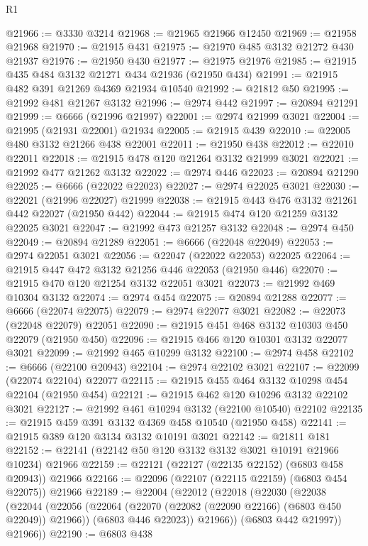 \begin{lexlean}{R1}
\begin{coremodule}
@21966 := @3330 @3214
@21968 := @21965 @21966 @12450
@21969 := @21958 @21968
@21970 := @21915 @431
@21975 := @21970 @485 @3132 @21272 @430 @21937
@21976 := @21950 @430
@21977 := @21975 @21976
@21985 := @21915 @435 @484 @3132 @21271 @434 @21936 (@21950 @434)
@21991 := @21915 @482 @391 @21269 @4369 @21934 @10540
@21992 := @21812 @50
@21995 := @21992 @481 @21267 @3132
@21996 := @2974 @442
@21997 := @20894 @21291
@21999 := @6666 (@21996 @21997)
@22001 := @2974 @21999 @3021
@22004 := @21995 (@21931 @22001) @21934
@22005 := @21915 @439
@22010 := @22005 @480 @3132 @21266 @438 @22001
@22011 := @21950 @438
@22012 := @22010 @22011
@22018 := @21915 @478 @120 @21264 @3132 @21999 @3021
@22021 := @21992 @477 @21262 @3132
@22022 := @2974 @446
@22023 := @20894 @21290
@22025 := @6666 (@22022 @22023)
@22027 := @2974 @22025 @3021
@22030 := @22021 (@21996 @22027) @21999
@22038 := @21915 @443 @476 @3132 @21261 @442 @22027 (@21950 @442)
@22044 := @21915 @474 @120 @21259 @3132 @22025 @3021
@22047 := @21992 @473 @21257 @3132
@22048 := @2974 @450
@22049 := @20894 @21289
@22051 := @6666 (@22048 @22049)
@22053 := @2974 @22051 @3021
@22056 := @22047 (@22022 @22053) @22025
@22064 := @21915 @447 @472 @3132 @21256 @446 @22053 (@21950 @446)
@22070 := @21915 @470 @120 @21254 @3132 @22051 @3021
@22073 := @21992 @469 @10304 @3132
@22074 := @2974 @454
@22075 := @20894 @21288
@22077 := @6666 (@22074 @22075)
@22079 := @2974 @22077 @3021
@22082 := @22073 (@22048 @22079) @22051
@22090 := @21915 @451 @468 @3132 @10303 @450 @22079 (@21950 @450)
@22096 := @21915 @466 @120 @10301 @3132 @22077 @3021
@22099 := @21992 @465 @10299 @3132
@22100 := @2974 @458
@22102 := @6666 (@22100 @20943)
@22104 := @2974 @22102 @3021
@22107 := @22099 (@22074 @22104) @22077
@22115 := @21915 @455 @464 @3132 @10298 @454 @22104 (@21950 @454)
@22121 := @21915 @462 @120 @10296 @3132 @22102 @3021
@22127 := @21992 @461 @10294 @3132 (@22100 @10540) @22102
@22135 := @21915 @459 @391 @3132 @4369 @458 @10540 (@21950 @458)
@22141 := @21915 @389 @120 @3134 @3132 @10191 @3021
@22142 := @21811 @181
@22152 := @22141 (@22142 @50 @120 @3132 @3132 @3021 @10191 @21966 @10234) @21966
@22159 := @22121 (@22127 (@22135 @22152) (@6803 @458 @20943)) @21966
@22166 := @22096 (@22107 (@22115 @22159) (@6803 @454 @22075)) @21966
@22189 := @22004
    (@22012
      (@22018
        (@22030
          (@22038
            (@22044
              (@22056
                (@22064 (@22070 (@22082 (@22090 @22166) (@6803 @450 @22049)) @21966))
                (@6803 @446 @22023))
              @21966))
          (@6803 @442 @21997))
        @21966))
@22190 := @6803 @438

\end{coremodule}
\end{lexlean}
